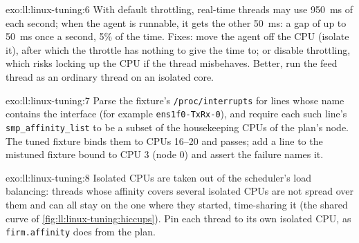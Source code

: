 \begin{solution}{exo:ll:linux-tuning:6}
With default throttling, real-time threads may use \qty{950}{\milli\second} of each second; when the agent is runnable, it gets
the other \qty{50}{\milli\second}: a gap of up to \qty{50}{\milli\second} once a second, 5\% of the time. Fixes: move the agent
off the CPU (isolate it), after which the throttle has nothing to give the time to; or disable throttling, which risks locking
up the CPU if the thread misbehaves. Better, run the feed thread as an ordinary thread on an isolated core.
\end{solution}

\begin{solution}{exo:ll:linux-tuning:7}
Parse the fixture's \texttt{/proc/interrupts} for lines whose name contains the interface (for example \texttt{ens1f0-TxRx-0}),
and require each such line's \texttt{smp\_affinity\_list} to be a subset of the housekeeping CPUs of the plan's node. The tuned
fixture binds them to CPUs 16--20 and passes; add a line to the mistuned fixture bound to CPU 3 (node 0) and assert the
failure names it.
\end{solution}

\begin{solution}{exo:ll:linux-tuning:8}
Isolated CPUs are taken out of the scheduler's load balancing: threads whose affinity covers several isolated CPUs are not
spread over them and can all stay on the one where they started, time-sharing it (the shared curve of
\cref{fig:ll:linux-tuning:hiccups}). Pin each thread to its own isolated CPU, as \texttt{firm.affinity} does from the plan.
\end{solution}

